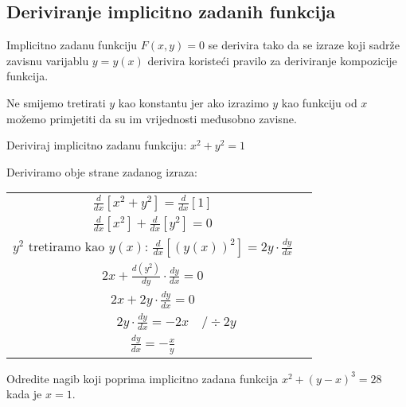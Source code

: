 \subsection{Deriviranje implicitno zadanih funkcija}

Implicitno zadanu funkciju $F(x,y) = 0$ se derivira tako da se izraze koji sadrže
zavisnu varijablu $y=y(x)$ derivira koristeći pravilo za deriviranje kompozicije
funkcija.

Ne smijemo tretirati $y$ kao konstantu jer ako izrazimo $y$ kao funkciju od $x$
možemo primjetiti da su im vrijednosti međusobno zavisne.

\begin{multicols}{2}
\begin{example}
    Deriviraj implicitno zadanu funkciju: $\displaystyle x^2 + y^2 = 1$
\end{example}

Deriviramo obje strane zadanog izraza:
\smallskip

\begin{tabular}{cl}
    \vspace*{11pt}$\displaystyle \frac{d}{dx}\left[x^2 + y^2\right] = \frac{d}{dx}[1]$\\
    \vspace*{11pt}$\displaystyle \frac{d}{dx}\left[x^2\right] + \frac{d}{dx}\left[y^2\right] = 0$\\
    \vspace*{11pt} $y^2$ tretiramo kao $y(x)$: $\displaystyle \frac{d}{dx}[(y(x))^2] = 2y\cdot\frac{dy}{dx}$\\
    \vspace*{11pt}$\displaystyle 2x + \frac{d(y^2)}{dy}\cdot\frac{dy}{dx} = 0$\\
    \vspace*{11pt}$\displaystyle 2x + 2y\cdot\frac{dy}{dx} = 0$\\
    \vspace*{11pt}$\displaystyle\phantom{\quad / \div 2y} 2y\cdot\frac{dy}{dx} = -2x\quad / \div 2y$ \\
    \vspace*{11pt}$\displaystyle\frac{dy}{dx} = -\frac{x}{y}$
\end{tabular}

\columnbreak

\begin{example}
    Odredite nagib koji poprima implicitno zadana funkcija $x^2+(y-x)^3=28$ kada je $x=1$.
\end{example}


\end{multicols}

